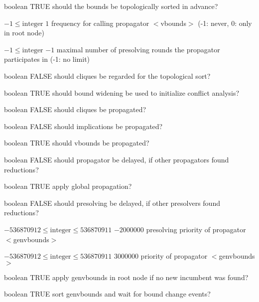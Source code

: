 %
{boolean}%
{TRUE}%
{should the bounds be topologically sorted in advance?}%
{}

%
{$-1\leq\textrm{integer}$}%
{$1$}%
{frequency for calling propagator $<$vbounds$>$ (-1: never, 0: only in root node)}%
{}

%
{$-1\leq\textrm{integer}$}%
{$-1$}%
{maximal number of presolving rounds the propagator participates in (-1: no limit)}%
{}

%
{boolean}%
{FALSE}%
{should cliques be regarded for the topological sort?}%
{}

%
{boolean}%
{TRUE}%
{should bound widening be used to initialize conflict analysis?}%
{}

%
{boolean}%
{FALSE}%
{should cliques be propagated?}%
{}

%
{boolean}%
{FALSE}%
{should implications be propagated?}%
{}

%
{boolean}%
{TRUE}%
{should vbounds be propagated?}%
{}

%
{boolean}%
{FALSE}%
{should propagator be delayed, if other propagators found reductions?}%
{}

%
{boolean}%
{TRUE}%
{apply global propagation?}%
{}

%
{boolean}%
{FALSE}%
{should presolving be delayed, if other presolvers found reductions?}%
{}

%
{$-536870912\leq\textrm{integer}\leq536870911$}%
{$-2000000$}%
{presolving priority of propagator $<$genvbounds$>$}%
{}

%
{$-536870912\leq\textrm{integer}\leq536870911$}%
{$3000000$}%
{priority of propagator $<$genvbounds$>$}%
{}

%
{boolean}%
{TRUE}%
{apply genvbounds in root node if no new incumbent was found?}%
{}

%
{boolean}%
{TRUE}%
{sort genvbounds and wait for bound change events?}%
{}

